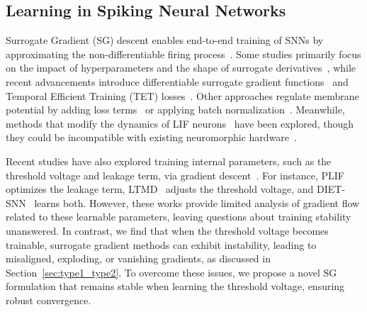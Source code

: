 \subsection{Learning in Spiking Neural Networks}
Surrogate Gradient (SG) descent enables end-to-end training of SNNs by approximating the non-differentiable firing process~\cite{lee:2016, wu:2018, wu:2019}. Some studies primarily focus on the impact of hyperparameters and the shape of surrogate derivatives~\cite{zenke:2021, li:2021}, while recent advancements introduce differentiable surrogate gradient functions~\cite{li:2021} and Temporal Efficient Training (TET) losses~\cite{deng:2022}. Other approaches regulate membrane potential by adding loss terms~\cite{guo:2022, guo:2023} or applying batch normalization~\cite{guo:2023_2}. Meanwhile, methods that modify the dynamics of LIF neurons~\cite{fang:2023, yao:2022, huang:2024} have been explored, though they could be incompatible with existing neuromorphic hardware~\cite{hunsberger:2015, review_guo:2023}.

Recent studies have also explored training internal parameters, such as the threshold voltage and leakage term, via gradient descent~\cite{fang:2021, wang:2022, rathi:2023}. For instance, PLIF~\cite{fang:2021} optimizes the leakage term, LTMD~\cite{wang:2022} adjusts the threshold voltage, and DIET-SNN~\cite{rathi:2023} learns both. However, these works provide limited analysis of gradient flow related to these learnable parameters, leaving questions about training stability unanswered. In contrast, we find that when the threshold voltage becomes trainable, surrogate gradient methods can exhibit instability, leading to misaligned, exploding, or vanishing gradients, as discussed in Section~\ref{sec:type1_type2}. To overcome these issues, we propose a novel SG formulation that remains stable when learning the threshold voltage, ensuring robust convergence.  
